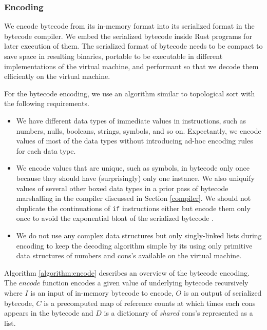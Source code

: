 \documentclass[sigplan]{acmart}
\begin{document}
\subsubsection{Encoding} \label{encoding}

We encode bytecode from its in-memory format into its serialized format in the
bytecode compiler.
We embed the serialized bytecode inside Rust programs for later
execution of them.
The serialized format of bytecode needs to be compact to save space in
resulting binaries, portable to be executable in different
implementations of the virtual machine, and performant so that we
decode them efficiently on the virtual machine.

For the bytecode encoding, we use an algorithm similar to topological
sort \cite{topologicalsort} with the following requirements.

\begin{itemize}
  \item We have different data types of immediate values in instructions,
    such as numbers, nulls, booleans, strings, symbols, and so on.
    Expectantly, we encode values of most of the data types without
    introducing ad-hoc encoding rules for each data type.
  \item We encode values that are unique, such as symbols, in
    bytecode only once
    because they should have (surprisingly) only one instance.
    We also uniquify values of several other boxed data
    types in a prior pass of bytecode marshalling in the
    compiler discussed in Section \ref{compiler}.
    We should not duplicate the continuations of \texttt{if}
    instructions either but encode them only once to avoid the exponential bloat
    of the serialized bytecode \cite{ribbit7kb2023}.
  \item We do not use any complex data structures but only singly-linked lists
    during encoding to keep the decoding algorithm simple by its using
    only primitive data structures of numbers and cons's available on
    the virtual machine.
\end{itemize}

Algorithm \ref{algorithm:encode} describes an overview of the bytecode
encoding.
The $encode$ function encodes a given value of
underlying bytecode recursively where $I$ is an input of in-memory
bytecode to encode,
$O$ is an output of serialized bytecode, $C$ is a precomputed map of
reference counts
at which times each cons appears in the bytecode and $D$ is a
dictionary of \textit{shared} cons's represented as a list.
\end{document}

